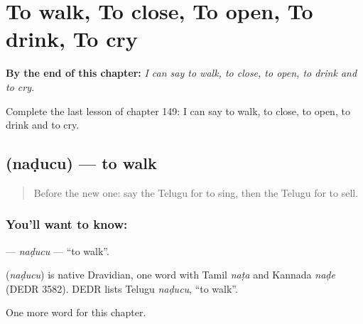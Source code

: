 
\chapter{To walk, To close, To open, To drink, To cry}
\label{ch:te-to-walk-to-close-to-open-to-drink-to-cry}

\begin{chapteropening}
\textbf{By the end of this chapter:} \emph{I can say to walk, to close, to open, to drink and to cry.}

Complete the last lesson of chapter 149: I can say to walk, to close, to open, to drink and to cry.
\end{chapteropening}

\section[\texorpdfstring{\te{నడుచు} (naḍucu)}{నడుచు (naḍucu)}]{ (naḍucu) — to walk}

\label{lesson:TE-C149-naducu}



\begin{quote}
Before the new one: say the Telugu for to sing, then the Telugu for to sell.
\end{quote}

\subsection*{You'll want to know: }
\textbf{} — \emph{naḍucu} — \textquotedblleft{}to walk\textquotedblright{}.

\begin{cousinweb}
\textbf{} (\emph{naḍucu}) is native Dravidian, one word with Tamil \emph{naṭa} and Kannada \emph{naḍe} (DEDR 3582). DEDR lists Telugu \emph{naḍucu}, \textquotedblleft{}to walk\textquotedblright{}.
\end{cousinweb}

\begin{grammarlens}[title={What you've built}]
One more word for this chapter.
\end{grammarlens}

